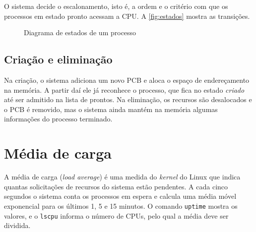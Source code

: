 O sistema decide o escalonamento, isto é, a ordem e o critério com que os processos em estado pronto acessam a CPU. A \autoref{fig:estados} mostra as transições.

\begin{figure}[H]
  \centering
  \caption{Diagrama de estados de um processo}\label{fig:estados}
\end{figure}

\subsection{Criação e eliminação}

Na criação, o sistema adiciona um novo PCB e aloca o espaço de endereçamento na memória. A partir daí ele já reconhece o processo, que fica no estado \textit{criado} até ser admitido na lista de prontos. Na eliminação, os recursos são desalocados e o PCB é removido, mas o sistema ainda mantém na memória algumas informações do processo terminado.

\section{Média de carga}

A média de carga (\textit{load average}) é uma medida do \textit{kernel} do Linux que indica quantas solicitações de recursos do sistema estão pendentes. A cada cinco segundos o sistema conta os processos em espera e calcula uma média móvel exponencial para os últimos 1, 5 e 15 minutos. O comando \texttt{uptime} mostra os valores, e o \texttt{lscpu} informa o número de CPUs, pelo qual a média deve ser dividida.

